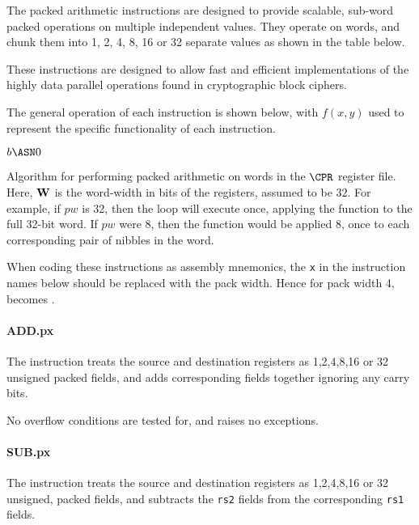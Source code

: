 The packed arithmetic instructions are designed to provide scalable, sub-word
packed operations on multiple independent values. They operate on words, and
chunk them into 1, 2, 4, 8, 16 or 32 separate values as shown in the table
below.

These instructions are designed to allow fast and efficient implementations
of the highly data parallel operations found in cryptographic block ciphers.

The general operation of each instruction is shown below, with $f(x,y)$
used to represent the specific functionality of each instruction.

\medskip

\begin{algorithm}[H]
    $b   \ASN 0 $\;
\caption{Algorithm for performing packed arithmetic on words in the 
$\CPR$ register file. Here, ${\bf W}$ is the word-width in bits of the
registers, assumed to be $32$. For example, if $pw$ is 32, then the loop
will execute once, applying the function to the full 32-bit word. If $pw$
were $8$, then the function would be applied $8$, once to each corresponding
pair of nibbles in the word.}
\end{algorithm}

When coding these instructions as assembly mnemonics, the {\tt x} in the
instruction names below should be replaced with the pack width. Hence
for pack width 4,  becomes .

\paragraph{ADD.px}

The instruction  treats the source and destination registers as
1,2,4,8,16 or 32 unsigned packed fields, and adds corresponding fields
together ignoring any carry bits.

No overflow conditions are tested for, and  raises no exceptions.

\paragraph{SUB.px}

The instruction  treats the source and destination registers as
1,2,4,8,16 or 32 unsigned, packed fields, and subtracts the {\tt rs2} fields
from the corresponding {\tt rs1} fields.

